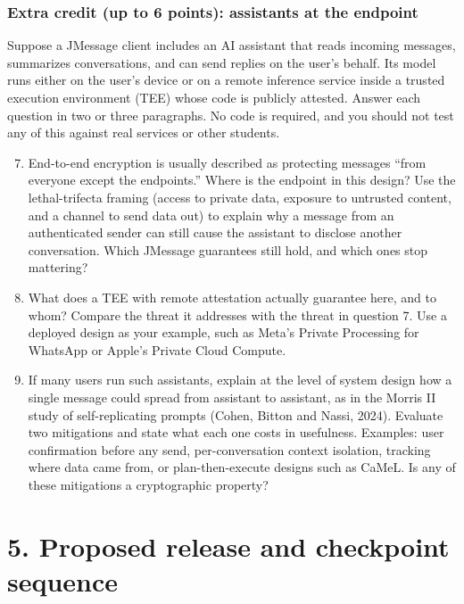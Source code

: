 \documentclass[11pt]{article}
\begin{document}
\subsubsection*{Extra credit (up to 6 points): assistants at the endpoint}

Suppose a JMessage client includes an AI assistant that reads incoming messages, summarizes conversations, and can send replies on the user's behalf. Its model runs either on the user's device or on a remote inference service inside a trusted execution environment (TEE) whose code is publicly attested. Answer each question in two or three paragraphs. No code is required, and you should not test any of this against real services or other students.

\begin{enumerate}
\setcounter{enumi}{6}
\item End-to-end encryption is usually described as protecting messages ``from everyone except the endpoints.'' Where is the endpoint in this design? Use the lethal-trifecta framing (access to private data, exposure to untrusted content, and a channel to send data out) to explain why a message from an authenticated sender can still cause the assistant to disclose another conversation. Which JMessage guarantees still hold, and which ones stop mattering?
\item What does a TEE with remote attestation actually guarantee here, and to whom? Compare the threat it addresses with the threat in question 7. Use a deployed design as your example, such as Meta's Private Processing for WhatsApp or Apple's Private Cloud Compute.
\item If many users run such assistants, explain at the level of system design how a single message could spread from assistant to assistant, as in the Morris II study of self-replicating prompts (Cohen, Bitton and Nassi, 2024). Evaluate two mitigations and state what each one costs in usefulness. Examples: user confirmation before any send, per-conversation context isolation, tracking where data came from, or plan-then-execute designs such as CaMeL. Is any of these mitigations a cryptographic property?
\end{enumerate}
\section*{5. Proposed release and checkpoint sequence}
\end{document}
